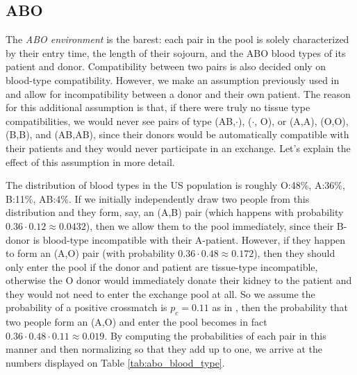 \documentclass[12pt]{article}
\begin{document}
\subsection{ABO}

The \emph{ABO environment} is the barest: each pair in the pool is solely characterized by their entry time, the length of their sojourn, and the ABO blood types of its patient and donor. Compatibility between two pairs is also decided only on blood-type compatibility. However, we make an assumption previously used in \cite{unver2010dynamic} and allow for incompatibility between a donor and their own patient. The reason for this additional assumption is that, if there were truly no tissue type compatibilities, we would never see pairs of type (AB,$\cdot$), ($\cdot$, O), or (A,A), (O,O), (B,B), and (AB,AB), since their donors would be automatically compatible with their patients and they would never participate in an exchange. Let's explain the effect of this assumption in more detail.

The distribution of blood types in the US population is roughly O:48\%, A:36\%, B:11\%, AB:4\%. If we initially independently draw two people from this distribution and they form, say, an (A,B) pair (which happens with probability $0.36 \cdot 0.12 \approx 0.0432$), then we allow them to the pool immediately, since their B-donor is blood-type incompatible with their A-patient. However, if they happen to form an (A,O) pair (with probability $0.36 \cdot 0.48 \approx 0.172$), then they should only enter the pool if the donor and patient are tissue-type incompatible, otherwise the O donor would immediately donate their kidney to the patient and they would not need to enter the exchange pool at all. So we assume the probability of a positive crossmatch is $p_c = 0.11$ as in \cite{zenios2001primum}, then the probability that two people form an (A,O) and enter the pool becomes in fact $0.36 \cdot 0.48  \cdot 0.11 \approx 0.019$. By computing the probabilities of each pair in this manner and then normalizing so that they add up to one, we arrive at the numbers displayed on Table \ref{tab:abo_blood_type}. 
\end{document}
